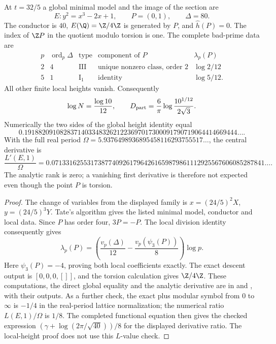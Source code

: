 \begin{statement}
At $t=32/5$ a global minimal model and the image of the section are
\[
 E:y^2=x^3-2x+1,\qquad P=(0,1),\qquad \Delta=80.
\]
The conductor is $40$, $E(\Q)=\Z/4\Z$ is generated by $P$,
and $\widehat h(P)=0$. The index of $\Z P$ in the quotient
modulo torsion is one. The complete bad-prime data are
\[
\begin{array}{c|c|c|c|c}
p&\operatorname{ord}_p\Delta&\text{type}&\text{component of }P&\lambda_p(P)\\\hline
2&4&\mathrm{III}&\text{unique nonzero class, order }2&\log2/12\\
5&1&\mathrm I_1&\text{identity}&\log5/12.
\end{array}
\]
All other finite local heights vanish. Consequently
\[
 \log N=\frac{\log10}{12},\qquad
 D_{\rm part}=\frac6\pi\log\frac{10^{1/12}}{2\sqrt3}.
\]
Numerically the two sides of the global height identity equal
\[
 0.191882091082837140334832621223697017300091790719064414669444\ldots.
\]
With the full real period $\Omega=5.9376498936895458116293755517\ldots$,
the central derivative is
\[
 \frac{L'(E,1)}\Omega=
 0.071331625531738774092617964261659879861112925567606085287841\ldots.
\]
The analytic rank is zero; a vanishing first derivative is therefore
not expected even though the point $P$ is torsion.
\end{statement}
\begin{proof}
The change of variables from the displayed family is
$x=(24/5)^2X$, $y=(24/5)^3Y$. Tate's algorithm gives the
listed minimal model, conductor and local data. Since $P$ has
order four, $3P=-P$. The local division identity consequently
gives
\[
 \lambda_p(P)=\left(\frac{v_p(\Delta)}{12}
                         -\frac{v_p(\psi_3(P))}{8}\right)\log p.
\]
Here $\psi_3(P)=-4$, proving both local coefficients exactly.
The exact descent output is $[0,0,0,[]]$, and the torsion
calculation gives $\Z/4\Z$. These computations, the direct
global equality and the analytic derivative are in
 and
, with their outputs.
As a further check, the exact plus modular symbol from $0$ to
$\infty$ is $-1/4$ in the real-period lattice normalization;
the numerical ratio $L(E,1)/\Omega$ is $1/8$. The completed
functional equation then gives the checked expression
$(\gamma+\log(2\pi/\sqrt{40}))/8$ for the displayed derivative
ratio. The local-height proof does not use this $L$-value check.
\end{proof}
